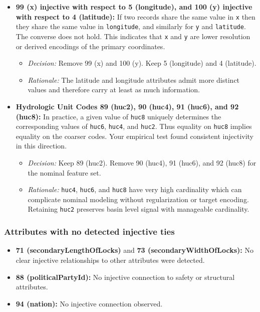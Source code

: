 \documentclass{article}
\begin{document}
\begin{itemize}
    \item \textbf{99 (x) injective with respect to 5 (longitude), and 100 (y) injective with respect to 4 (latitude):}
    If two records share the same value in \texttt{x} then they share the same value in \texttt{longitude}, and similarly for \texttt{y} and \texttt{latitude}. The converse does not hold. This indicates that \texttt{x} and \texttt{y} are lower resolution or derived encodings of the primary coordinates.
    \begin{itemize}
        \item \textit{Decision:} Remove 99 (x) and 100 (y). Keep 5 (longitude) and 4 (latitude).
        \item \textit{Rationale:} The latitude and longitude attributes admit more distinct values and therefore carry at least as much information.
    \end{itemize}

    \item \textbf{Hydrologic Unit Codes 89 (huc2), 90 (huc4), 91 (huc6), and 92 (huc8):}
    In practice, a given value of \texttt{huc8} uniquely determines the corresponding values of \texttt{huc6}, \texttt{huc4}, and \texttt{huc2}. Thus equality on \texttt{huc8} implies equality on the coarser codes. Your empirical test found consistent injectivity in this direction.
    \begin{itemize}
        \item \textit{Decision:} Keep 89 (huc2). Remove 90 (huc4), 91 (huc6), and 92 (huc8) for the nominal feature set.
        \item \textit{Rationale:} \texttt{huc4}, \texttt{huc6}, and \texttt{huc8} have very high cardinality which can complicate nominal modeling without regularization or target encoding. Retaining \texttt{huc2} preserves basin level signal with manageable cardinality.
    \end{itemize}
\end{itemize}

\subsubsection*{Attributes with no detected injective ties}

\begin{itemize}
    \item \textbf{71 (secondaryLengthOfLocks)} and \textbf{73 (secondaryWidthOfLocks):}
    No clear injective relationships to other attributes were detected.
    \item \textbf{88 (politicalPartyId):} No injective connection to safety or structural attributes.
    \item \textbf{94 (nation):} No injective connection observed.
  
\end{itemize}
\end{document}

